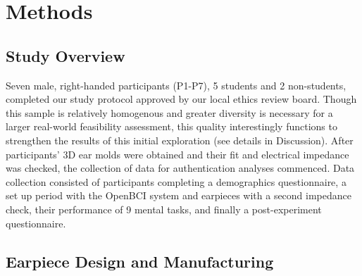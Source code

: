 \documentclass{sigchi}
\begin{document}


\section{Methods}

\subsection{Study Overview}

Seven male, right-handed participants (P1-P7), 5 students and 2 non-students, completed our study protocol approved by our local ethics review board. Though this sample is relatively homogenous and greater diversity is necessary for a larger real-world feasibility assessment, this quality interestingly functions to strengthen the results of this initial exploration (see details in Discussion). After participants' 3D ear molds were obtained and their fit and electrical impedance was checked, the collection of data for authentication analyses commenced. Data collection consisted of participants completing a demographics questionnaire, a set up period with the OpenBCI system and earpieces with a second impedance check, their performance of 9 mental tasks, and finally a post-experiment questionnaire.

\subsection{Earpiece Design and Manufacturing}
\end{document}
